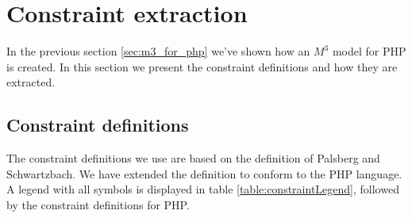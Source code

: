 \documentclass[../main.tex]{subfiles}
\begin{document}
    \section{Constraint extraction}\label{sec:constraint_extraction}
    
    In the previous section \ref{sec:m3_for_php} we've shown how an $M^3$ model for PHP is created.
    In this section we present the constraint definitions and how they are extracted.
    
    \subsection{Constraint definitions}
    The constraint definitions we use are based on the definition of Palsberg and Schwartzbach\cite{Pal:94}.
    We have extended the definition to conform to the PHP language.
    A legend with all symbols is displayed in table \ref{table:constraintLegend}, followed by the constraint definitions for PHP.

\end{document}

